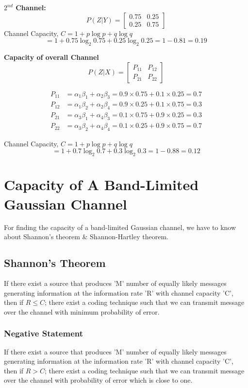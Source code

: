 \documentclass[12pt]{article}
\begin{document}
\textbf{$2^{nd}$ Channel:}
$$ P(Z|Y) = \begin{bmatrix} 0.75 & 0.25 \\ 0.25 & 0.75 \end{bmatrix} $$
Channel Capacity, $C = 1 + p \log p + q \log q$
$$ = 1 + 0.75 \log_2 0.75 + 0.25 \log_2 0.25 = 1 - 0.81 = 0.19 $$

\textbf{Capacity of overall Channel}
$$ P(Z|X) = \begin{bmatrix} P_{11} & P_{12} \\ P_{21} & P_{22} \end{bmatrix} $$

\begin{align*}
P_{11} &= \alpha_1\beta_1 + \alpha_2\beta_3 = 0.9 \times 0.75 + 0.1 \times 0.25 = 0.7 \\
P_{12} &= \alpha_1\beta_2 + \alpha_2\beta_4 = 0.9 \times 0.25 + 0.1 \times 0.75 = 0.3 \\
P_{21} &= \alpha_3\beta_1 + \alpha_4\beta_3 = 0.1 \times 0.75 + 0.9 \times 0.25 = 0.3 \\
P_{22} &= \alpha_3\beta_2 + \alpha_4\beta_4 = 0.1 \times 0.25 + 0.9 \times 0.75 = 0.7
\end{align*}

Channel Capacity, $C = 1 + p \log p + q \log q$
$$ = 1 + 0.7 \log_2 0.7 + 0.3 \log_2 0.3 = 1 - 0.88 = 0.12 $$


\section{Capacity of A Band-Limited Gaussian Channel}
For finding the capacity of a band-limited Gaussian channel, we have to know about Shannon's theorem \& Shannon-Hartley theorem.

\subsection{Shannon's Theorem}
If there exist a source that produces 'M' number of equally likely messages generating information at the information rate 'R' with channel capacity 'C', then if $R \le C$; there exist a coding technique such that we can transmit message over the channel with minimum probability of error.

\subsubsection*{Negative Statement}
If there exist a source that produces 'M' number of equally likely messages generating information at the information rate 'R' with channel capacity 'C', then if $R > C$; there exist a coding technique such that we can transmit message over the channel with probability of error which is close to one.
\end{document}
